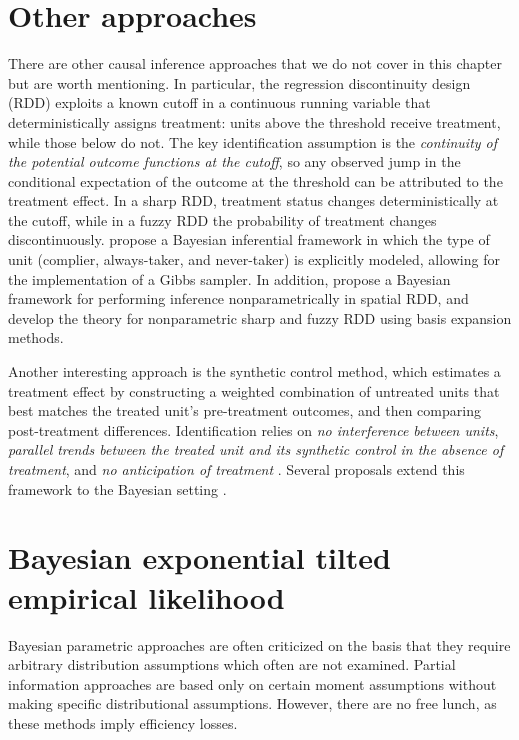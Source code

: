 \section{Other approaches}\label{sec12_3}
There are other causal inference approaches that we do not cover in this chapter but are worth mentioning. In particular, the regression discontinuity design (RDD) exploits a known cutoff in a continuous running variable that deterministically assigns treatment: units above the threshold receive treatment, while those below do not. The key identification assumption is the \textit{continuity of the potential outcome functions at the cutoff}, so any observed jump in the conditional expectation of the outcome at the threshold can be attributed to the treatment effect. In a sharp RDD, treatment status changes deterministically at the cutoff, while in a fuzzy RDD the probability of treatment changes discontinuously. \cite{chib2016bayesian} propose a Bayesian inferential framework in which the type of unit (complier, always-taker, and never-taker) is explicitly modeled, allowing for the implementation of a Gibbs sampler. In addition, \cite{rischard2020bayesian} propose a Bayesian framework for performing inference nonparametrically in spatial RDD, and \cite{chib2023nonparametric} develop the theory for nonparametric sharp and fuzzy RDD using basis expansion methods.

Another interesting approach is the synthetic control method, which estimates a treatment effect by constructing a weighted combination of untreated units that best matches the treated unit's pre-treatment outcomes, and then comparing post-treatment differences. Identification relies on \textit{no interference between units}, \textit{parallel trends between the treated unit and its synthetic control in the absence of treatment}, and \textit{no anticipation of treatment} \cite{abadie2010synthetic}. Several proposals extend this framework to the Bayesian setting \cite{amjad2018robust,kim2020bayesian,pang2022bayesian}.


\section{Bayesian exponential tilted empirical likelihood}\label{sec12_8}
Bayesian parametric approaches are often criticized on the basis that they require arbitrary distribution assumptions which often are not examined. Partial information approaches are based only on certain moment assumptions without making specific distributional assumptions. However, there are no free lunch, as these methods imply efficiency losses.

